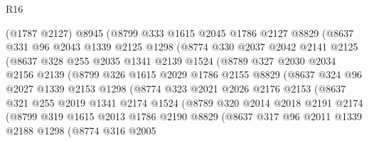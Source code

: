 \begin{lexlean}{R16}
\begin{coremodule}
            (@1787 @2127)
            @8945
            (@8799
              @333
              @1615
              @2045
              @1786
              @2127
              @8829
              (@8637
                @331
                @96
                @2043
                @1339
                @2125
                @1298
                (@8774
                  @330
                  @2037
                  @2042
                  @2141
                  @2125
                  (@8637
                    @328
                    @255
                    @2035
                    @1341
                    @2139
                    @1524
                    (@8789
                      @327
                      @2030
                      @2034
                      @2156
                      @2139
                      (@8799
                        @326
                        @1615
                        @2029
                        @1786
                        @2155
                        @8829
                        (@8637
                          @324
                          @96
                          @2027
                          @1339
                          @2153
                          @1298
                          (@8774
                            @323
                            @2021
                            @2026
                            @2176
                            @2153
                            (@8637
                              @321
                              @255
                              @2019
                              @1341
                              @2174
                              @1524
                              (@8789
                                @320
                                @2014
                                @2018
                                @2191
                                @2174
                                (@8799
                                  @319
                                  @1615
                                  @2013
                                  @1786
                                  @2190
                                  @8829
                                  (@8637
                                    @317
                                    @96
                                    @2011
                                    @1339
                                    @2188
                                    @1298
                                    (@8774
                                      @316
                                      @2005

\end{coremodule}
\end{lexlean}
